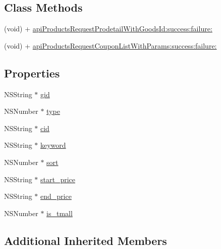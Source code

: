 \subsection*{Class Methods}
\begin{DoxyCompactItemize}
\item 
(void) + \mbox{\hyperlink{interface_f_n_a_p_i_products_tool_ab7547cc9fe36980b15a746061d7b1417}{api\+Products\+Request\+Prodetail\+With\+Goods\+Id\+:success\+:failure\+:}}
\item 
(void) + \mbox{\hyperlink{interface_f_n_a_p_i_products_tool_ab3dc486c76f34e2a98e07265eb0be799}{api\+Products\+Request\+Coupon\+List\+With\+Params\+:success\+:failure\+:}}
\end{DoxyCompactItemize}
\subsection*{Properties}
\begin{DoxyCompactItemize}
\item 
N\+S\+String $\ast$ \mbox{\hyperlink{interface_f_n_a_p_i_products_tool_a11725fb92941e148c4784e7a4cadbddb}{gid}}
\item 
N\+S\+Number $\ast$ \mbox{\hyperlink{interface_f_n_a_p_i_products_tool_a84ab2adae6554b9ffd21665f940dd648}{type}}
\item 
N\+S\+String $\ast$ \mbox{\hyperlink{interface_f_n_a_p_i_products_tool_a70e69f683b73621eed12c5537aff3549}{cid}}
\item 
N\+S\+String $\ast$ \mbox{\hyperlink{interface_f_n_a_p_i_products_tool_a0fefc7e542162d7e027fbf20697b8583}{keyword}}
\item 
N\+S\+Number $\ast$ \mbox{\hyperlink{interface_f_n_a_p_i_products_tool_ad2673af9059ba40c41e60d021dee094d}{sort}}
\item 
N\+S\+String $\ast$ \mbox{\hyperlink{interface_f_n_a_p_i_products_tool_add290482b441320e698cb9c82564b0e6}{start\+\_\+price}}
\item 
N\+S\+String $\ast$ \mbox{\hyperlink{interface_f_n_a_p_i_products_tool_a0ef89d87b96a1eb12d24b2da5fa9ab16}{end\+\_\+price}}
\item 
N\+S\+Number $\ast$ \mbox{\hyperlink{interface_f_n_a_p_i_products_tool_a06349fb72d3ccdd893f36a036ea66a88}{is\+\_\+tmall}}
\end{DoxyCompactItemize}
\subsection*{Additional Inherited Members}


